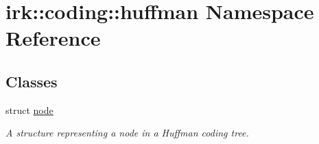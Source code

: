 \hypertarget{namespaceirk_1_1coding_1_1huffman}{}\section{irk\+:\+:coding\+:\+:huffman Namespace Reference}
\label{namespaceirk_1_1coding_1_1huffman}
\subsection*{Classes}
\begin{DoxyCompactItemize}
\item 
struct \mbox{\hyperlink{structirk_1_1coding_1_1huffman_1_1node}{node}}
\begin{DoxyCompactList}\small\item\em A structure representing a node in a Huffman coding tree. \end{DoxyCompactList}\end{DoxyCompactItemize}
